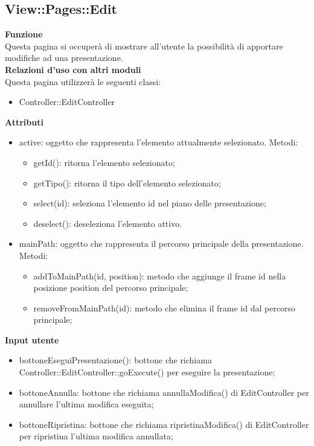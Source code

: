 {\subsection{View::Pages::Edit}{
	\textbf{Funzione}\\
	\indent Questa pagina si occuperà di mostrare all'utente la possibilità di apportare modifiche ad una presentazione.\\
	\textbf{Relazioni d'uso con altri moduli}\\
	\indent Questa pagina utilizzerà le seguenti classi:
	\begin{itemize}
		\item Controller::EditController
	\end{itemize}
	\textbf{Attributi}\\
		\begin{itemize}
			\item active: oggetto che rappresenta l'elemento attualmente selezionato. Metodi:
			\begin{itemize}
				\item getId(): ritorna l'elemento selezionato;
				\item getTipo(): ritorna il tipo dell'elemento selezionato;
				\item select(id): seleziona l'elemento id nel piano delle presentazione;
				\item deselect(): deseleziona l'elemento attivo.
			\end{itemize}
			\item mainPath: oggetto che rappresenta il percorso principale della presentazione. Metodi:
			\begin{itemize}
				\item addToMainPath(id, position): metodo che aggiunge il frame id nella posizione position del percorso principale;
				\item removeFromMainPath(id): metodo che elimina il frame id dal percorso principale;
			\end{itemize}
		\end{itemize}
	\textbf{Input utente}
	\begin{itemize}
		\item bottoneEseguiPresentazione(): bottone che richiama Controller::EditController::goExecute() per eseguire la presentazione;
		\item bottoneAnnulla: bottone che richiama annullaModifica() di EditController per annullare l'ultima modifica eseguita;
		\item bottoneRipristina: bottone che richiama ripristinaModifica() di EditController per ripristina l'ultima modifica annullata;

\end{itemize}}}
